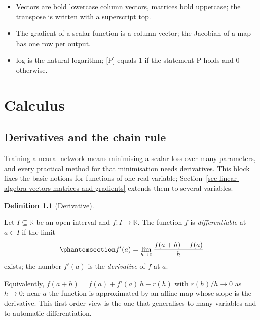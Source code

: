 \documentclass[
  english,
  11pt,
  a4paper,
  twoside,
  open=any,
  numbers=noenddot]{scrbook}
\providecommand{\tightlist}{%
  \setlength{\itemsep}{0pt}\setlength{\parskip}{0pt}}
\theoremstyle{plain}
\theoremstyle{plain}
\theoremstyle{plain}
\theoremstyle{definition}
\newtheorem{definition}{Definition}[chapter]
\theoremstyle{definition}
\theoremstyle{definition}
\theoremstyle{remark}
\begin{document}

\begin{itemize}
\tightlist
\item
  Vectors are bold lowercase column vectors, matrices bold uppercase;
  the transpose is written with a superscript top.
\item
  The gradient of a scalar function is a column vector; the Jacobian of
  a map has one row per output.
\item
  log is the natural logarithm; {[}P{]} equals 1 if the statement P
  holds and 0 otherwise.
\end{itemize}


\chapter{Calculus}\label{sec-calculus}

\section{Derivatives and the chain
rule}\label{sec-calculus-derivatives-and-the-chain-rule}

Training a neural network means minimising a scalar loss over many
parameters, and every practical method for that minimisation needs
derivatives. This block fixes the basic notions for functions of one
real variable;
Section~\ref{sec-linear-algebra-vectors-matrices-and-gradients} extends
them to several variables.

\begin{definition}[Derivative]\protect\hypertarget{def-derivative}{}\label{def-derivative}

Let \(I \subseteq \mathbb{R}\) be an open interval and
\(f\colon I \to \mathbb{R}\). The function \(f\) is
\emph{differentiable} at \(a \in I\) if the limit
\begin{equation}\protect\phantomsection\label{eq-derivative}{
f'(a) = \lim_{h \to 0} \frac{f(a+h) - f(a)}{h}
}\end{equation} exists; the number \(f'(a)\) is the
\emph{derivative} of \(f\) at \(a\).

\end{definition}

Equivalently, \(f(a+h) = f(a) + f'(a)\,h + r(h)\) with \(r(h)/h \to 0\)
as \(h \to 0\): near \(a\) the function is approximated by an affine map
whose slope is the derivative. This first-order view is the one that
generalises to many variables and to automatic differentiation.
\end{document}

